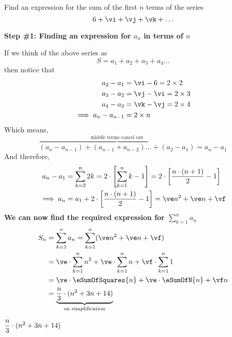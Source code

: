 



\DIVIDE{}\ve
\SUBTRACT\va\vd\vf %

\EXPR[0]
\EXPR[0]
\EXPR[0]

\question[3] Find an expression for the sum of the first $n$ terms of the series 
\[ \va + \vi + \vj + \vk + \ldots \]

\watchout

\begin{solution}[\halfpage]
  \textbf{Step \#1: Finding an expression for $a_n$ in terms of $n$}

  If we think of the above series as 
  \[ S = a_1 + a_2 + a_3 + a_4 \ldots \]
  then notice that 
  \begin{align}
    a_2 - a_1 &= \vi-\va = \vd\times 2 \\ 
    a_3 - a_2 &= \vj-\vi = \vd\times 3 \\ 
    a_4 - a_3 &= \vk-\vj = \vd\times 4 \\ 
    \implies a_n - a_{n-1} &= \vd\times n
  \end{align}
  Which means, 
  \[ \overbrace{(a_n-a_{n-1}) + (a_{n-1} + a_{n-2})\ldots + (a_2-a_1)}^{\text{middle terms cancel out}} = a_n - a_1 \]
  And therefore, 
  \begin{align}
    a_n - a_1 &= \sum_{k=2}^n \vd k = \vd\cdot\left[ \sum_{k=1}^n k - 1 \right] = 
    \vd\cdot\left[ \dfrac{n\cdot(n+1)}{2} - 1 \right] \\
    \implies a_n &= a_1 + \vd\cdot\left[ \dfrac{n\cdot(n+1)}{2} - 1 \right] = \ve n^2 + \ve n + \vf 
  \end{align}
  \textbf{We can now find the required expression for $\sum_{k=1}^n a_n$}
  \begin{align}
    S_n &= \sum_{k=1}^n a_n = \sum_{k=1}^n (\ve n^2 + \ve n + \vf) \\ 
    &= \ve\cdot\sum_{k=1}^n n^2 + \ve\cdot\sum_{k=1}^n n + \vf\cdot\sum_{k=1}^n 1 \\ 
    &= \ve\cdot\eSumOfSquares{n} + \ve\cdot\eSumOfN{n} + \vf n \\
    &= \underbrace{\vz}_{\text{on simplification}}
  \end{align}
\end{solution}

\ifprintanswers\begin{codex}$\dfrac{n}{3}\cdot (n^2+3n+14)$\end{codex}\fi
